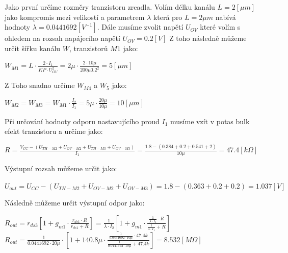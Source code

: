 Jako první určíme rozměry tranzistoru zrcadla.
Volím délku kanálu \(L = 2 [\mu m]\) jako kompromis mezi velikostí a parametrem \(\lambda\) která pro \(L = 2 \mu m\) nabívá hodnoty \(\lambda = 0.0441692 [V^{-1}]\).
Dále musíme zvolit napětí \(U_{OV}\) které volím s ohledem na rozsah napájecího napětí \(U_{OV} = 0.2 [V]\)
Z toho následně můžeme určit šířku kanálu \(W\), tranzistorů \(M1\) jako:

\begin{center}
    \large
    \(
        W_{M1} = L \cdot \frac{2 \cdot I_1}{KP \cdot U_{OV}^2} = 2\mu \cdot \frac{2 \cdot 10\mu}{200\mu 0.2^2} = 5 [\mu m]
    \)
\end{center}

Z Toho snadno určíme \(W_{M4}\) a \(W_{5}\) jako:

\begin{center}
    \large
    \(
        W_{M2} = W_{M3} = W_{M1} \cdot \frac{I_2}{I_1} = 5\mu \cdot \frac{20\mu}{10\mu} = 10 [\mu m]
    \)
\end{center}

Při určování hodnoty odporu nastavujícího proud \(I_1\) musíme vzít v potas bulk efekt tranzistoru  a určíme jako:

\begin{center}
    \large
    \(
        R = \frac{V_{CC} - (U_{TH-M2} + U_{OV-M2} + U_{TH-M3} + U_{OV-M3})}{I_1} = \frac{1.8 - (0.384 + 0.2 + 0.541 + 2)}{10\mu} = 47.4 [k\Omega] 
    \)
\end{center}

Výstupní rozsah můžeme určit jako:
\begin{center}
    \large
    \(
        U_{out} = U_{CC} - (U_{TH-M2} + U_{OV-M2} + U_{OV-M3}) = 1.8 - (0.363+0.2+0.2) = 1.037 [V]
    \)
\end{center}

Následně můžeme určit výstupní odpor jako:
\begin{center}
    \Large
    \(
        R_{out} = r_{ds3} \left[ 1 + g_{m1} \cdot \frac{r_{ds1} \cdot R}{r_{ds1} + R} \right] = \frac{1}{\lambda \cdot I_2} \left[ 1 + g_{m1} \cdot \frac{\frac{1}{\lambda \cdot I_1} \cdot R}{\frac{1}{\lambda \cdot I_1} + R} \right]
    \)
    \(
        R_{out} = \frac{1}{0.0441692 \cdot 20\mu} \cdot \left[ 1 +  140.8\mu \cdot \frac{\frac{1}{0.0441692 \cdot 10\mu} \cdot 47.4k}{\frac{1}{0.0441692 \cdot 10\mu} + 47.4k}\right] = 8.532 [M\Omega]
    \)
\end{center}

